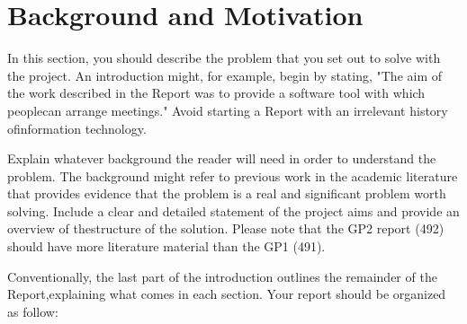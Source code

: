 
\section{Background and Motivation}

In this section, you should describe the problem that you set out to solve with the project. An introduction might, for example, begin by stating, "The aim of the work described in the Report was to provide a software tool with which peoplecan arrange meetings." Avoid starting a Report with an irrelevant history ofinformation technology.

Explain whatever background the reader will need in order to understand the problem. The background might refer to previous work in the academic literature that provides evidence that the problem is a real and significant problem worth solving. Include a clear and detailed statement of the project aims and provide an overview of thestructure of the solution. Please note that the GP2 report (492) should have more literature material than the GP1 (491).

Conventionally, the last part of the introduction outlines the remainder of the Report,explaining what comes in each section. Your report should be organized as follow: